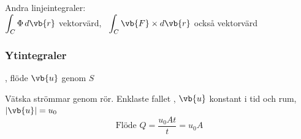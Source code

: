 Andra linjeintegraler:\\
$\displaystyle\int_C \Phi\,d\vb{r}$ vektorvärd, \ $\displaystyle\int_C \vb{F} \times d\vb{r}$ också vektorvärd

\subsubsection*{Ytintegraler}
\begin{example}
, flöde $\vb{u}$ genom $S$

Vätska strömmar genom rör. Enklaste fallet
, $\vb{u}$ konstant i tid och rum, $|\vb{u}| = u_0$
\[ \text{Flöde } Q = \frac{u_0 A t}{t} = u_0 A \]
\end{example}
